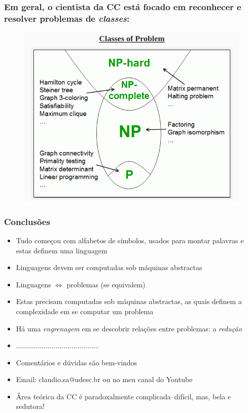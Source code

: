 \documentclass[10pt]{beamer}
\begin{document}
\begin{frame}[fragile]
\frametitle{Em geral, o cientista da CC está focado em reconhecer e resolver problemas de \emph{classes}:}
\begin{figure}[!ht]
	\centering
	\includegraphics[height =.7\textheight,width=.8\textwidth]
	{figuras/classes_de_problemas.png}
\end{figure}

\end{frame}


\begin{frame}[fragile]
\frametitle{Conclusões}
\begin{itemize}
    \item Tudo começou com alfabetos de símbolos, usados para  montar palavras e estas definem uma linguagem
    \item Linguagens devem ser computadas sob máquinas abstractas
    \item Linguagens $\Leftrightarrow$ problemas (se equivalem)
    \item Estas precisam computadas sob máquinas abstractas, as quais definem a complexidade em se computar um problema
    \item Há uma \emph{engrenagem} em se descobrir relações entre problemas: a \emph{redução}
    \item ..........................................
    
	\item Comentários e dúvidas são bem-vindos

	\item Email:  claudio.sa@udesc.br ou no meu canal do Youtube
	\pause
	\item Área teórica da CC  é paradoxalmente  complicada--difícil, mas, bela e  sedutora!
\end{itemize}

\end{frame}

\end{document}
